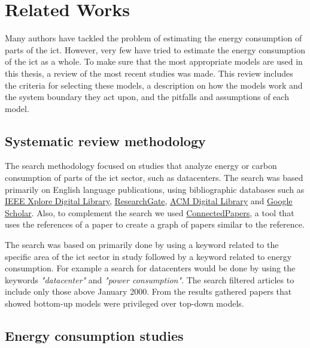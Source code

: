 \chapter{Related Works}
\label{chapter:related_works}

\begin{introduction}
    Many authors have tackled the problem of estimating the energy consumption of parts of the \ac{ict}. However, very few have tried to estimate the energy consumption of the \ac{ict} as a whole. To make sure that the most appropriate models are used in this thesis, a review of the most recent studies was made. This review includes the criteria for selecting these models, a description on how the models work and the system boundary they act upon, and the pitfalls and assumptions of each model.
\end{introduction}

\section{Systematic review methodology}

The search methodology focused on studies that analyze energy or carbon consumption of parts of the \ac{ict} sector, such as datacenters. The search was based primarily on English language publications, using bibliographic databases such as \href{https://ieeexplore.ieee.org}{IEEE Xplore Digital Library}, \href{https://www.researchgate.net/}{ResearchGate}, \href{https://dl.acm.org/}{ACM Digital Library} and \href{https://scholar.google.com/}{Google Scholar}. Also, to complement the search we used \href{https://www.connectedpapers.com/}{ConnectedPapers}, a tool that uses the references of a paper to create a graph of papers similar to the reference.

The search was based on primarily done by using a keyword related to the specific area of the \ac{ict} sector in study followed by a keyword related to energy consumption. For example a search for datacenters would be done by using the keywords \textit{"datacenter"} and \textit{"power consumption"}. The search filtered articles to include only those above January 2000. 
From the results gathered papers that showed bottom-up models were privileged over top-down models. 

\section{Energy consumption studies}

